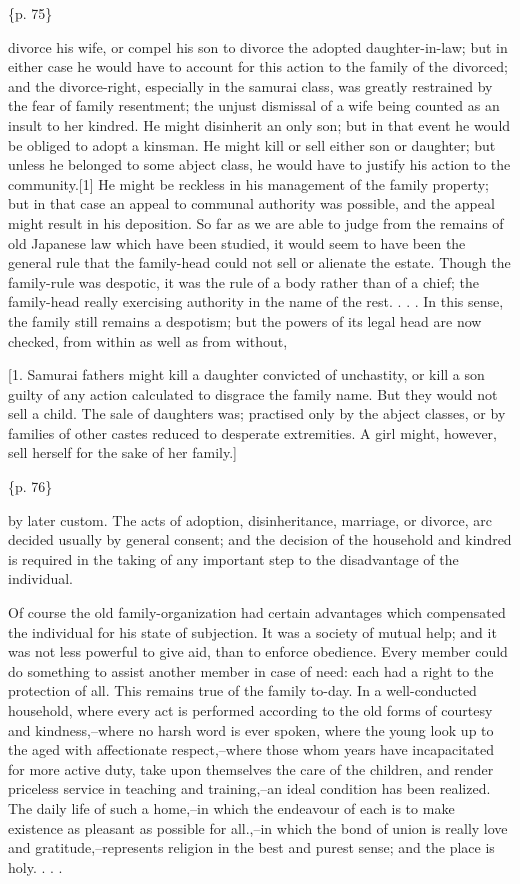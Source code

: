 \{p. 75\}

divorce his wife, or compel his son to divorce the adopted daughter-in-law; but in either case he would have to account for this action to the family of the divorced; and the divorce-right, especially in the samurai class, was greatly restrained by the fear of family resentment; the unjust dismissal of a wife being counted as an insult to her kindred. He might disinherit an only son; but in that event he would be obliged to adopt a kinsman. He might kill or sell either son or daughter; but unless he belonged to some abject class, he would have to justify his action to the community.[1] He might be reckless in his management of the family property; but in that case an appeal to communal authority was possible, and the appeal might result in his deposition. So far as we are able to judge from the remains of old Japanese law which have been studied, it would seem to have been the general rule that the family-head could not sell or alienate the estate. Though the family-rule was despotic, it was the rule of a body rather than of a chief; the family-head really exercising authority in the name of the rest. . . . In this sense, the family still remains a despotism; but the powers of its legal head are now checked, from within as well as from without,

[1. Samurai fathers might kill a daughter convicted of unchastity, or kill a son guilty of any action calculated to disgrace the family name. But they would not sell a child. The sale of daughters was; practised only by the abject classes, or by families of other castes reduced to desperate extremities. A girl might, however, sell herself for the sake of her family.]

\{p. 76\}

by later custom. The acts of adoption, disinheritance, marriage, or divorce, arc decided usually by general consent; and the decision of the household and kindred is required in the taking of any important step to the disadvantage of the individual.

Of course the old family-organization had certain advantages which compensated the individual for his state of subjection. It was a society of mutual help; and it was not less powerful to give aid, than to enforce obedience. Every member could do something to assist another member in case of need: each had a right to the protection of all. This remains true of the family to-day. In a well-conducted household, where every act is performed according to the old forms of courtesy and kindness,--where no harsh word is ever spoken, where the young look up to the aged with affectionate respect,--where those whom years have incapacitated for more active duty, take upon themselves the care of the children, and render priceless service in teaching and training,--an ideal condition has been realized. The daily life of such a home,--in which the endeavour of each is to make existence as pleasant as possible for all.,--in which the bond of union is really love and gratitude,--represents religion in the best and purest sense; and the place is holy. . . .



